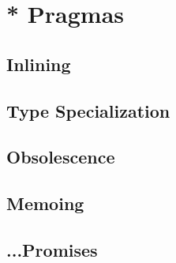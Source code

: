 \section{* Pragmas}
\subsection{Inlining}
\subsection{Type Specialization}
\subsection{Obsolescence}
\subsection{Memoing}
\subsection{...Promises}




